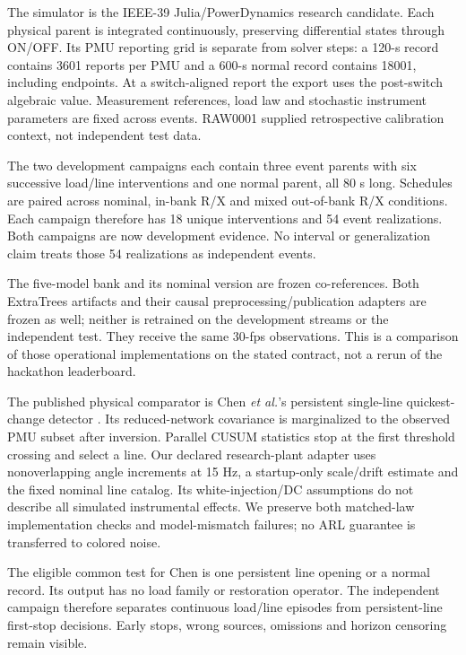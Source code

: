 The simulator is the IEEE-39 Julia/PowerDynamics research candidate. Each physical parent is integrated continuously, preserving differential states through ON/OFF. Its PMU reporting grid is separate from solver steps: a 120-s record contains 3601 reports per PMU and a 600-s normal record contains 18001, including endpoints. At a switch-aligned report the export uses the post-switch algebraic value. Measurement references, load law and stochastic instrument parameters are fixed across events. RAW0001 supplied retrospective calibration context, not independent test data.

The two development campaigns each contain three event parents with six successive load/line interventions and one normal parent, all 80 s long. Schedules are paired across nominal, in-bank R/X and mixed out-of-bank R/X conditions. Each campaign therefore has 18 unique interventions and 54 event realizations. Both campaigns are now development evidence. No interval or generalization claim treats those 54 realizations as independent events.

The five-model bank and its nominal version are frozen co-references. Both ExtraTrees artifacts and their causal preprocessing/publication adapters are frozen as well; neither is retrained on the development streams or the independent test. They receive the same 30-fps observations. This is a comparison of those operational implementations on the stated contract, not a rerun of the hackathon leaderboard.

The published physical comparator is Chen \emph{et al.}'s persistent single-line quickest-change detector \cite{chen2016quickest}. Its reduced-network covariance is marginalized to the observed PMU subset after inversion. Parallel CUSUM statistics stop at the first threshold crossing and select a line. Our declared research-plant adapter uses nonoverlapping angle increments at 15 Hz, a startup-only scale/drift estimate and the fixed nominal line catalog. Its white-injection/DC assumptions do not describe all simulated instrumental effects. We preserve both matched-law implementation checks and model-mismatch failures; no ARL guarantee is transferred to colored noise.

The eligible common test for Chen is one persistent line opening or a normal record. Its output has no load family or restoration operator. The independent campaign therefore separates continuous load/line episodes from persistent-line first-stop decisions. Early stops, wrong sources, omissions and horizon censoring remain visible.

